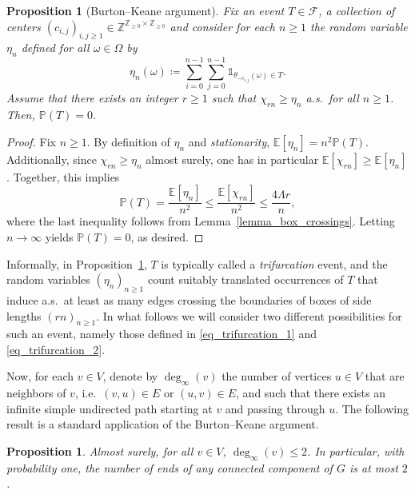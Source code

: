 \documentclass[a4paper, 11pt]{article} %
\theoremstyle{plain}
\newtheorem{proposition}[theorem]{Proposition}
\newcommand{\E}{\mathbb{E}}
\newcommand{\Z}{\mathbb{Z}}
\newcommand{\1}{\mathds 1}
\renewcommand{\P}{\mathbb{P}}
\numberwithin{equation}{section}
\begin{document}
\begin{proposition}[Burton--Keane argument]
    \label{prop_burton_and_keane}
    Fix an event $T\in\mathcal F$, a collection of centers $(c_{i, j})_{i, j\geq1}\in\Z^{\Z_{\geq 0}\times\Z_{\geq 0}}$ and consider for each $n\geq 1$ the random variable $\eta_n$ defined for all $\omega\in\Omega$ by
        \[\eta_n(\omega)\coloneqq\sum_{i=0}^{n-1}\sum_{j=0}^{n-1}\1_{\theta_{-c_{i,j}}(\omega)\in T}.\]
    Assume that there exists an integer $r\geq1$ such that $\chi_{rn}\geq\eta_n$ a.s.\ for all $n\geq 1$. Then, $\P(T)=0$.
\end{proposition}

\begin{proof}
    Fix $n\geq1$. By definition of $\eta_n$ and \emph{stationarity}, $\E[\eta_n]=n^2\P(T)$. Additionally, since $\chi_{rn}\geq\eta_n$ almost surely, one has in particular $\E[\chi_{rn}]\geq\E[\eta_n]$. Together, this implies
        \[\P(T)=\frac{\E[\eta_n]}{n^2}\leq\frac{\E[\chi_{rn}]}{n^2}\leq\frac{4\Lambda r}{n},\]
    where the last inequality follows from Lemma~\ref{lemma_box_crossings}. Letting $n\to\infty$ yields $\P(T)=0$, as desired.
\end{proof}


Informally, in Proposition~\ref{prop_burton_and_keane}, $T$ is typically called a \emph{trifurcation} event, and the random variables $(\eta_n)_{n\geq1}$ count suitably translated occurrences of $T$ that induce a.s.\ at least as many edges crossing the boundaries of boxes of side lengths $(rn)_{n\geq1}$. In what follows we will consider two different possibilities for such an event, namely those defined in \eqref{eq_trifurcation_1} and \eqref{eq_trifurcation_2}.

Now, for each $v\in V$, denote by $\deg_\infty(v)$ the number of vertices $u\in V$ that are neighbors of $v$, i.e.\ $(v,u)\in E$ or $(u, v)\in E$, and such that there exists an infinite simple undirected path starting at $v$ and passing through $u$. The following result is a standard application of the Burton--Keane argument.


\begin{proposition}
    \label{prop_at_most_2_ends}
    Almost surely, for all $v\in V$, $\deg_\infty(v)\leq2$. In particular, with probability one, the number of ends of any connected component of $G$ is at most $2$.
\end{proposition}
\end{document}
